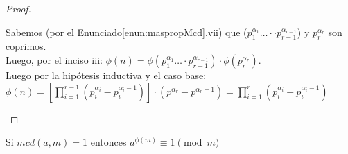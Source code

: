 \begin{proof}
\begin{enumerate}[label=\roman*)]
Sabemos (por el Enunciado\ref{enun:maspropMcd}.vii) que ($p_{1}^{\alpha_{1}} \ldots \cdot \cdot p_{r-1}^{\alpha_{r-1}}$) y $p_{r}^{\alpha_{r}}$ son coprimos.\\
Luego, por el inciso iii: $\phi(n)=\phi(p_{1}^{\alpha_{1}} \ldots \cdot p_{r-1}^{\alpha_{r-1}}) \cdot \phi(p_{r}^{\alpha_{r}})$. \\
Luego por la hipótesis inductiva y el caso base: \\
$\phi(n)=[\prod_{i=1}^{r-1}(p_{i}^{\alpha_{i}}-p_{i}^{\alpha_{i}-1})] \cdot(p^{\alpha_{r}}-p^{\alpha_{r}-1})=\prod_{i=1}^{r}(p_{i}^{\alpha_{i}}-p_{i}^{\alpha_{i}-1})$
\end{enumerate}
\end{proof}

\begin{enunciado} \label{enun:teorEuler}\leavevmode\par
Si $mcd(a, m)=1$ entonces $a^{\phi(m)} \equiv 1 \pmod m$
\end{enunciado}

